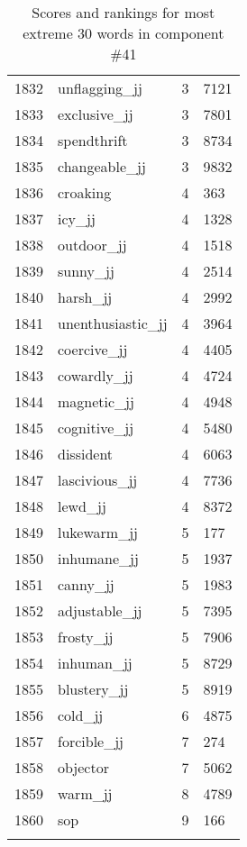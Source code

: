 \begin{longtable}[!htbp]{| rlr@{.}l |}
    1832 & unflagging\_jj & 3 & 7121 \\
    1833 & exclusive\_jj & 3 & 7801 \\
    1834 & spendthrift & 3 & 8734 \\
    1835 & changeable\_jj & 3 & 9832 \\
    1836 & croaking & 4 & 363 \\
    1837 & icy\_jj & 4 & 1328 \\
    1838 & outdoor\_jj & 4 & 1518 \\
    1839 & sunny\_jj & 4 & 2514 \\
    1840 & harsh\_jj & 4 & 2992 \\
    1841 & unenthusiastic\_jj & 4 & 3964 \\
    1842 & coercive\_jj & 4 & 4405 \\
    1843 & cowardly\_jj & 4 & 4724 \\
    1844 & magnetic\_jj & 4 & 4948 \\
    1845 & cognitive\_jj & 4 & 5480 \\
    1846 & dissident & 4 & 6063 \\
    1847 & lascivious\_jj & 4 & 7736 \\
    1848 & lewd\_jj & 4 & 8372 \\
    1849 & lukewarm\_jj & 5 & 177 \\
    1850 & inhumane\_jj & 5 & 1937 \\
    1851 & canny\_jj & 5 & 1983 \\
    1852 & adjustable\_jj & 5 & 7395 \\
    1853 & frosty\_jj & 5 & 7906 \\
    1854 & inhuman\_jj & 5 & 8729 \\
    1855 & blustery\_jj & 5 & 8919 \\
    1856 & cold\_jj & 6 & 4875 \\
    1857 & forcible\_jj & 7 & 274 \\
    1858 & objector & 7 & 5062 \\
    1859 & warm\_jj & 8 & 4789 \\
    1860 & sop & 9 & 166 \\
    \hline
    \caption{Scores and rankings for most extreme 30 words in component \#41} \\
\end{longtable}
